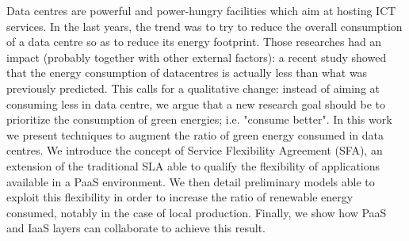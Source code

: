 Data centres are powerful and power-hungry facilities which aim at hosting ICT services.
In the last years, the trend was to try to reduce the overall consumption of a data centre so as to reduce its energy footprint.
Those researches had an impact (probably together with other external factors): a recent study showed that the energy consumption of datacentres is actually less than what was previously predicted.
This calls for a qualitative change: instead of aiming at consuming less in data centre, we argue that a new research goal should be to prioritize the consumption of green energies; i.e. "consume better".
In this work we present techniques to augment the ratio of green energy consumed in data centres.
We introduce the concept of Service Flexibility Agreement (SFA), an extension of the traditional SLA able to qualify the flexibility of applications available in a PaaS environment.
We then detail preliminary models able to exploit this flexibility in order to increase the ratio of renewable energy consumed, notably in the case of local production.
Finally, we show how PaaS and IaaS layers can collaborate to achieve this result.





